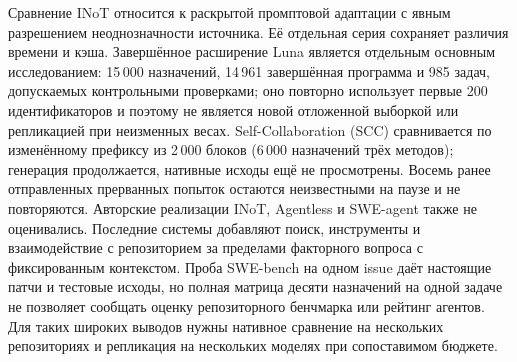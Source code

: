 Сравнение INoT относится к раскрытой промптовой адаптации с явным разрешением неоднозначности источника. Её отдельная серия сохраняет различия времени и кэша. Завершённое расширение Luna является отдельным основным исследованием: 15\,000 назначений, 14\,961 завершённая программа и 985 задач, допускаемых контрольными проверками; оно повторно использует первые 200 идентификаторов и поэтому не является новой отложенной выборкой или репликацией при неизменных весах. Self-Collaboration (SCC) сравнивается по изменённому префиксу из 2\,000 блоков (6\,000 назначений трёх методов); генерация продолжается, нативные исходы ещё не просмотрены. Восемь ранее отправленных прерванных попыток остаются неизвестными на паузе и не повторяются. Авторские реализации INoT, Agentless и SWE-agent также не оценивались. Последние системы добавляют поиск, инструменты и взаимодействие с репозиторием за пределами факторного вопроса с фиксированным контекстом. Проба SWE-bench на одном issue даёт настоящие патчи и тестовые исходы, но полная матрица десяти назначений на одной задаче не позволяет сообщать оценку репозиторного бенчмарка или рейтинг агентов. Для таких широких выводов нужны нативное сравнение на нескольких репозиториях и репликация на нескольких моделях при сопоставимом бюджете.

